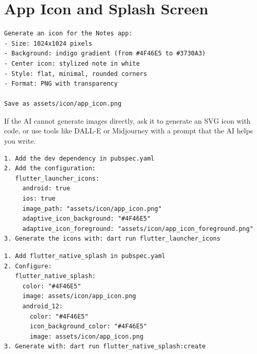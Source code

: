 \section{App Icon and Splash Screen}

\begin{praticabox}[title={Hands-on --- Generate the icon with AI}]
\begin{lstlisting}[language={}]
Generate an icon for the Notes app:
- Size: 1024x1024 pixels
- Background: indigo gradient (from #4F46E5 to #3730A3)
- Center icon: stylized note in white
- Style: flat, minimal, rounded corners
- Format: PNG with transparency

Save as assets/icon/app_icon.png
\end{lstlisting}
\end{praticabox}

\begin{tipbox}
If the AI cannot generate images directly, ask it to generate an SVG icon with code, or use tools like DALL-E or Midjourney with a prompt that the AI helps you write.
\end{tipbox}

\begin{praticabox}[title={Hands-on --- Configure flutter\_launcher\_icons}]
\begin{lstlisting}[language={}]
1. Add the dev dependency in pubspec.yaml
2. Add the configuration:
   flutter_launcher_icons:
     android: true
     ios: true
     image_path: "assets/icon/app_icon.png"
     adaptive_icon_background: "#4F46E5"
     adaptive_icon_foreground: "assets/icon/app_icon_foreground.png"
3. Generate the icons with: dart run flutter_launcher_icons
\end{lstlisting}
\end{praticabox}

\begin{praticabox}[title={Hands-on --- Splash Screen}]
\begin{lstlisting}[language={}]
1. Add flutter_native_splash in pubspec.yaml
2. Configure:
   flutter_native_splash:
     color: "#4F46E5"
     image: assets/icon/app_icon.png
     android_12:
       color: "#4F46E5"
       icon_background_color: "#4F46E5"
       image: assets/icon/app_icon.png
3. Generate with: dart run flutter_native_splash:create
\end{lstlisting}
\end{praticabox}

